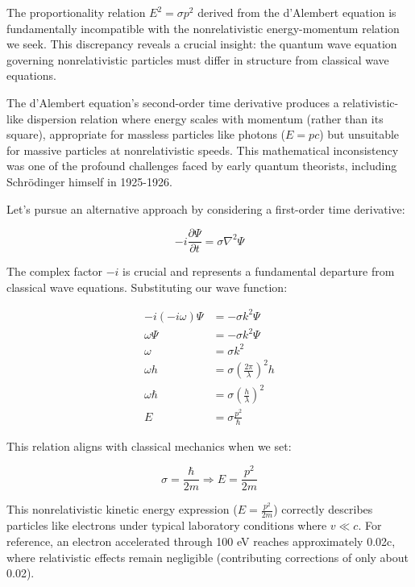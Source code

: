 The proportionality relation $E^2 = \sigma p^2$ derived from the d'Alembert equation is fundamentally incompatible with the nonrelativistic energy-momentum relation we seek. This discrepancy reveals a crucial insight: the quantum wave equation governing nonrelativistic particles must differ in structure from classical wave equations.

The d'Alembert equation's second-order time derivative produces a relativistic-like dispersion relation where energy scales with momentum (rather than its square), appropriate for massless particles like photons ($E = pc$) but unsuitable for massive particles at nonrelativistic speeds. This mathematical inconsistency was one of the profound challenges faced by early quantum theorists, including Schrödinger himself in 1925-1926.

Let's pursue an alternative approach by considering a first-order time derivative:

\begin{equation}
-i \frac{\partial \Psi}{\partial t}=\sigma \nabla^{2} \Psi \label{eq:1.4}
\end{equation}

The complex factor $-i$ is crucial and represents a fundamental departure from classical wave equations. Substituting our wave function:

\begin{align}
-i(-i\omega) \Psi & =-\sigma k^{2} \Psi \\
\omega \Psi & =-\sigma k^{2} \Psi \\
\omega & =\sigma k^{2} \\
\omega h & =\sigma\left(\frac{2 \pi}{\lambda}\right)^{2} h  \\
\omega \hbar & =\sigma\left(\frac{h}{\lambda}\right)^{2} \\
E & =\sigma \frac{p^{2}}{\hbar}
\end{align}

This relation aligns with classical mechanics when we set:

\begin{equation}
\sigma=\frac{\hbar}{2 m} \Rightarrow E=\frac{p^{2}}{2 m}
\end{equation}

This nonrelativistic kinetic energy expression ($E=\frac{p^2}{2m}$) correctly describes particles like electrons under typical laboratory conditions where $v \ll c$. For reference, an electron accelerated through 100 eV reaches approximately 0.02c, where relativistic effects remain negligible (contributing corrections of only about 0.02).

